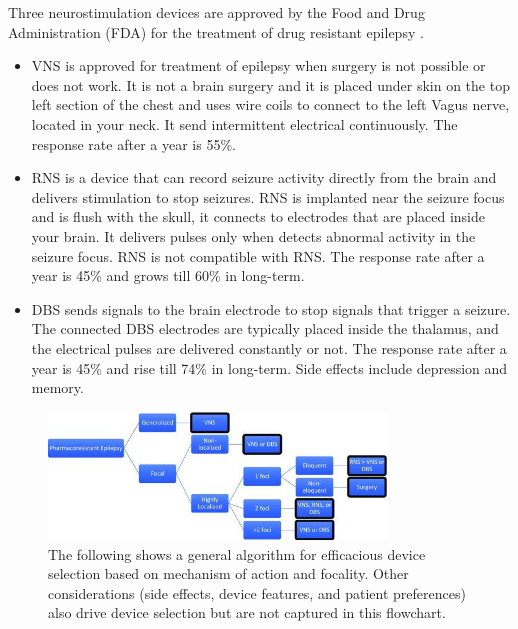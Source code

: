   Three neurostimulation devices are approved by the Food and Drug Administration (FDA) for the treatment of drug resistant epilepsy \cite{kiriakopoulos_cascino_britton_2018, wong2019comparison}.
  \begin{itemize}
    \item VNS is approved for treatment of epilepsy when surgery is not possible or does not work. It is not a brain surgery and it is placed under skin on the top left section of the chest and uses wire coils to connect to the left Vagus nerve, located in your neck. It send intermittent electrical continuously. The response rate after a year is 55\%.
    \item RNS is a device that can record seizure activity directly from the brain and delivers stimulation to stop seizures. RNS is implanted near the seizure focus and is flush with the skull, it connects to electrodes that are placed inside your brain. It delivers pulses only when detects abnormal activity in the seizure focus. RNS is not compatible with RNS. The response rate after a year is 45\% and grows till 60\% in long-term.
    \item DBS sends signals to the brain electrode to stop signals that trigger a seizure. The connected DBS electrodes are typically placed inside the thalamus, and the electrical pulses are delivered constantly or not. The response rate after a year is 45\% and rise till 74\% in long-term. Side effects include depression and memory.
  \end{itemize}

  \begin{figure}[h]
    \centering
    \includegraphics[width=0.8\textwidth]{images/WongMani2019.jpeg}
    \caption{The following shows a general algorithm for efficacious device selection based on mechanism of action and focality. Other considerations (side effects, device features, and patient preferences) also drive device selection but are not captured in this flowchart. \cite{wong2019comparison}}
    \label{fig:Decision algorithm}
  \end{figure}

